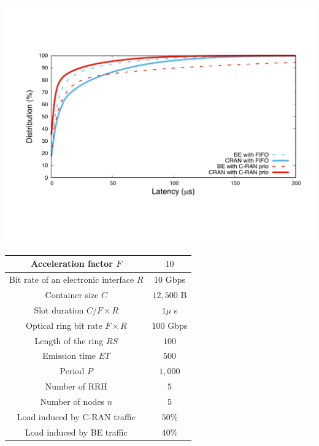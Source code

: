 \documentclass[]{algotel}
\begin{document}
    \begin{minipage}[b]{0.50\linewidth}


        \begin{center}
      \includegraphics[scale=0.3]{opport.pdf}

          \label{fig:resultopport}
      \end{center} 
  \end{minipage}
\hfill
  \begin{minipage}[b]{0.40\linewidth}
  \vspace{-2cm}
  \scalebox{0.7}
  {
  \centering
  \begin{tabular}{|c|c|}
  \hline
 Acceleration factor $F$ & $10$  \tabularnewline
  \hline
  Bit rate of an electronic interface $R$ & $10$ Gbps \tabularnewline
  \hline
  Container size  $C$ & $12,500$ B  \tabularnewline
  \hline
  Slot duration $C/F\times R$ & $1\mu$ s \tabularnewline
  \hline
  Optical ring bit rate $F\times R$ & $100$ Gbps \tabularnewline
  \hline
  Length of the ring $RS$ & $100$ \tabularnewline
  \hline
  Emission time $ET$ & $500$ \tabularnewline
  \hline
   Period $P$ & $1,000$ \tabularnewline
  \hline
  Number of RRH & $5$  \tabularnewline
  \hline
  Number of nodes $n$ & $5$  \tabularnewline
  \hline
   Load induced by C-RAN traffic & $50\%$  \tabularnewline
  \hline
    Load induced by BE traffic & $40\%$  \tabularnewline
  \hline
  \end{tabular}
  }
  \vspace{0.3cm}
  \label{fig:params}

  \end{minipage} 
  
\end{document}
